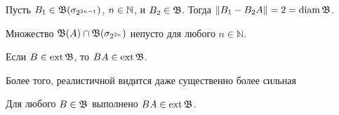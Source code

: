 \begin{hypothesis}
	Пусть $B_1 \in \mathfrak{B}(\sigma_{2^{2n-1}})$, $n\in\mathbb{N}$, и $B_2\in \mathfrak{B}$.
	Тогда $\|B_1 - B_2 A\| = 2 = \operatorname{diam} \mathfrak{B}$.
\end{hypothesis}

\begin{hypothesis}
	Множество $\mathfrak{B}(A) \cap \mathfrak{B} (\sigma_{2^{2n}})$ непусто для любого $n\in \mathbb N$.
\end{hypothesis}

\begin{hypothesis}
	Если $B\in\operatorname{ext}\mathfrak{B}$, то $BA \in \operatorname{ext} \mathfrak{B}$.
\end{hypothesis}

Более того, реалистичной видится даже существенно более сильная

\begin{hypothesis}
	Для любого $B\in\mathfrak{B}$ выполнено $BA \in \operatorname{ext} \mathfrak{B}$.
\end{hypothesis}
